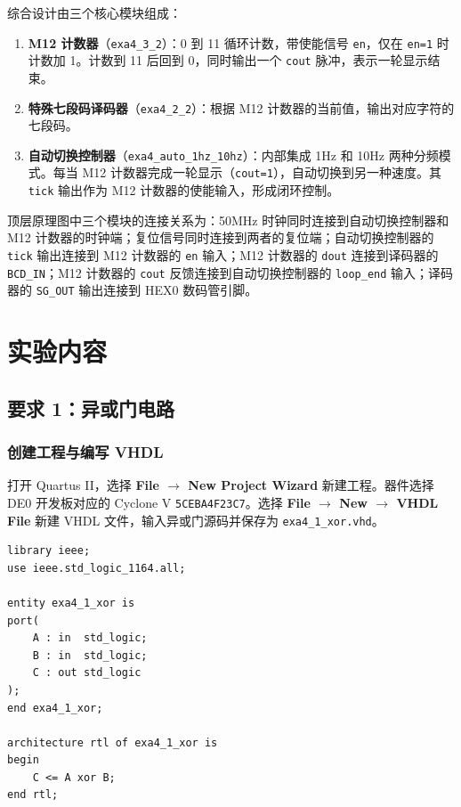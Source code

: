 \documentclass{ctexrep}
\begin{document}
综合设计由三个核心模块组成：

\begin{enumerate}
    \item \textbf{M12 计数器}（\texttt{exa4\_3\_2}）：0 到 11 循环计数，带使能信号 \texttt{en}，仅在 \texttt{en=1} 时计数加 1。计数到 11 后回到 0，同时输出一个 \texttt{cout} 脉冲，表示一轮显示结束。
    \item \textbf{特殊七段码译码器}（\texttt{exa4\_2\_2}）：根据 M12 计数器的当前值，输出对应字符的七段码。
    \item \textbf{自动切换控制器}（\texttt{exa4\_auto\_1hz\_10hz}）：内部集成 1Hz 和 10Hz 两种分频模式。每当 M12 计数器完成一轮显示（\texttt{cout=1}），自动切换到另一种速度。其 \texttt{tick} 输出作为 M12 计数器的使能输入，形成闭环控制。
\end{enumerate}

顶层原理图中三个模块的连接关系为：50MHz 时钟同时连接到自动切换控制器和 M12 计数器的时钟端；复位信号同时连接到两者的复位端；自动切换控制器的 \texttt{tick} 输出连接到 M12 计数器的 \texttt{en} 输入；M12 计数器的 \texttt{dout} 连接到译码器的 \texttt{BCD\_IN}；M12 计数器的 \texttt{cout} 反馈连接到自动切换控制器的 \texttt{loop\_end} 输入；译码器的 \texttt{SG\_OUT} 输出连接到 HEX0 数码管引脚。

\section{实验内容}

\subsection{要求 1：异或门电路}

\subsubsection{创建工程与编写 VHDL}

打开 Quartus II，选择 \textbf{File $\rightarrow$ New Project Wizard} 新建工程。器件选择 DE0 开发板对应的 Cyclone V \texttt{5CEBA4F23C7}。选择 \textbf{File $\rightarrow$ New $\rightarrow$ VHDL File} 新建 VHDL 文件，输入异或门源码并保存为 \texttt{exa4\_1\_xor.vhd}。

\begin{verbatim}
library ieee;
use ieee.std_logic_1164.all;

entity exa4_1_xor is
port(
    A : in  std_logic;
    B : in  std_logic;
    C : out std_logic
);
end exa4_1_xor;

architecture rtl of exa4_1_xor is
begin
    C <= A xor B;
end rtl;
\end{verbatim}
\label{e4:lst:xor}
\end{document}
